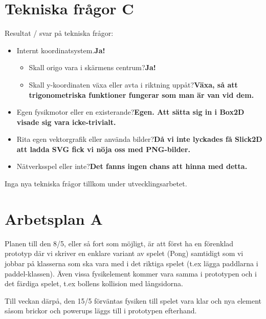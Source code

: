 \documentclass[a4paper,11pt]{article}
\begin{document}
\section{Tekniska frågor C}
Resultat / svar på tekniska frågor:
\begin{itemize}
\item Internt koordinatsystem.\newline \textbf{Ja!}
\begin{itemize}
\item Skall origo vara i skärmens centrum?\newline \textbf{Ja!}
\item Skall y-koordinaten växa eller avta i riktning uppåt?\newline \textbf{Växa, så att trigonometriska funktioner fungerar som man är van vid dem.}
\end{itemize}

\item Egen fysikmotor eller en existerande?\newline \textbf{Egen. Att sätta sig in i Box2D visade sig vara icke-trivialt.}

\item Rita egen vektorgrafik eller använda bilder?\newline \textbf{Då vi inte lyckades få Slick2D att ladda SVG fick vi nöja oss med PNG-bilder.}

\item Nätverksspel eller inte?\newline \textbf{Det fanns ingen chans att hinna med detta.}
\end{itemize}

Inga nya tekniska frågor tillkom under utvecklingsarbetet.

\section{Arbetsplan A}
Planen till den 8/5, eller så fort som möjligt, är att först ha en förenklad prototyp där vi skriver en enklare variant av spelet (Pong) samtidigt som vi jobbar 
på klasserna som ska vara med i det riktiga spelet (t.ex lägga paddlarna i paddel-klassen).
Även vissa fysikelement kommer vara samma i prototypen och i det färdiga spelet, t.ex bollens kollision med
långsidorna.

\bigskip
\noindent Till veckan därpå, den 15/5 förväntas fysiken till spelet vara klar och nya element såsom brickor
och powerups läggs till i prototypen efterhand.
\end{document}

